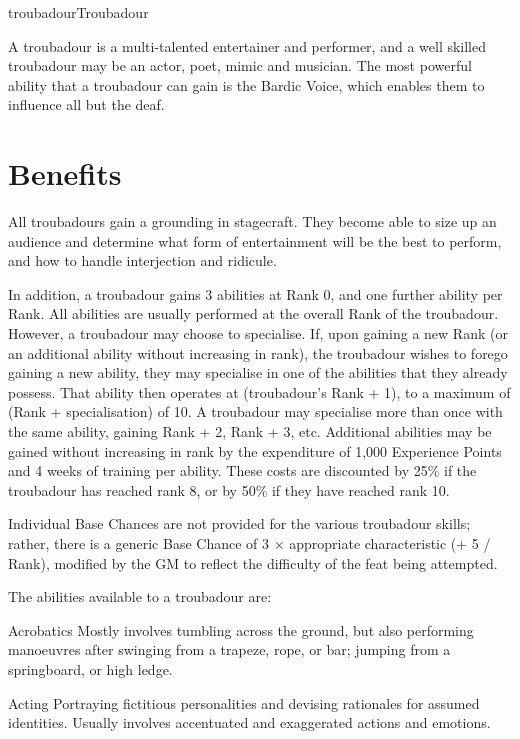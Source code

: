 \begin{Skill}[2.1]{troubadour}{Troubadour}

A troubadour is a multi-talented entertainer and performer, and a well
skilled troubadour may be an actor, poet, mimic and musician. The most
powerful ability that a troubadour can gain is the Bardic Voice,
which enables them to influence all but the deaf.

\section{Benefits}
All troubadours gain a grounding in stagecraft.  They become able to
size up an audience and determine what form of entertainment will be
the best to perform, and how to handle interjection and ridicule.

In addition, a troubadour gains 3 abilities at Rank 0, and one further
ability per Rank. All abilities are usually performed at the overall
Rank of the troubadour.  However, a troubadour may choose to
specialise.  If, upon gaining a new Rank (or an additional ability
without increasing in rank), the troubadour wishes to forego gaining a
new ability, they may specialise in one of the abilities that they
already possess. That ability then operates at (troubadour’s Rank +
1), to a maximum of (Rank + specialisation) of 10.  A troubadour may
specialise more than once with the same ability, gaining Rank + 2,
Rank + 3, etc.  Additional abilities may be gained without increasing
in rank by the expenditure of 1,000 Experience Points and 4 weeks of
training per ability.  These costs are discounted by 25\% if the
troubadour has reached rank 8, or by 50\% if they have reached rank
10.

Individual Base Chances are not provided for the various troubadour
skills; rather, there is a generic Base Chance of 3 × appropriate
characteristic (+ 5 / Rank), modified by the GM to reflect the
difficulty of the feat being attempted.

The abilities available to a troubadour are:

\begin{Description}
\item[Acrobatics] Mostly involves tumbling across the ground, but also
  performing manoeuvres after swinging from a trapeze, rope, or bar;
  jumping from a springboard, or high ledge.

\item[Acting] Portraying fictitious personalities and devising
  rationales for assumed identities.  Usually involves accentuated and
  exaggerated actions and emotions.


\end{Description}
\end{Skill}
